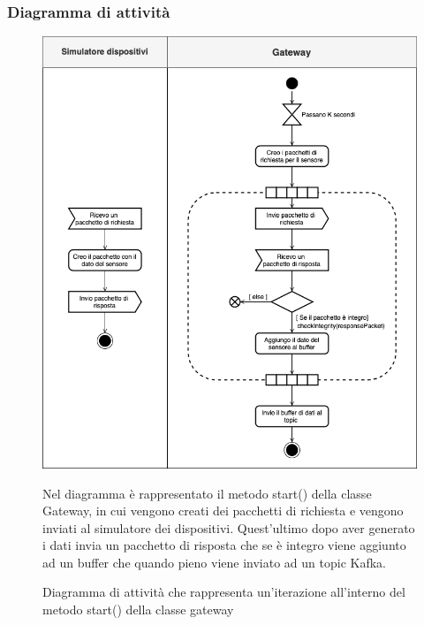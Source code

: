 	\subsubsection{Diagramma di attività}%
		\begin{figure}[H]
			\centering
			\includegraphics[scale=0.500]{res/images/GATEWAY/gateway.start().png}
			\caption{Diagramma di attività che rappresenta un'iterazione all'interno del metodo start() della classe gateway}
			\label{Diagramma 4}
		 Nel diagramma è rappresentato il metodo start() della classe Gateway, in cui vengono creati dei pacchetti di richiesta e vengono inviati al simulatore dei dispositivi. Quest'ultimo dopo aver generato i dati invia un pacchetto di risposta che se è integro viene aggiunto ad un buffer che quando pieno viene inviato ad un topic Kafka.   
		\end{figure}